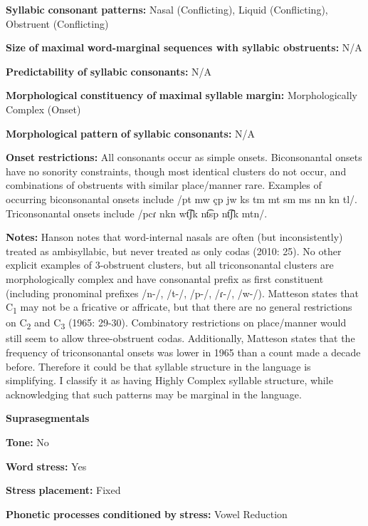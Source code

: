 \textbf{Syllabic} \textbf{consonant} \textbf{patterns:} Nasal (Conflicting), Liquid (Conflicting), Obstruent (Conflicting)

\textbf{Size} \textbf{of} \textbf{maximal} \textbf{word{}-marginal sequences with syllabic obstruents:} N/A

\textbf{Predictability} \textbf{of} \textbf{syllabic} \textbf{consonants:} N/A

\textbf{Morphological} \textbf{constituency} \textbf{of} \textbf{maximal} \textbf{syllable} \textbf{margin:} Morphologically Complex (Onset)

\textbf{Morphological} \textbf{pattern} \textbf{of} \textbf{syllabic} \textbf{consonants:} N/A

\textbf{Onset} \textbf{restrictions:} All consonants occur as simple onsets. Biconsonantal onsets have no sonority constraints, though most identical clusters do not occur, and combinations of obstruents with similar place/manner rare. Examples of occurring biconsonantal onsets include /pt mw çp jw ks tm mt sm ms nn kn tl/. Triconsonantal onsets include /pcɾ nkn wt͡ʃk nt͡sp nt͡ʃk mtn/.

\textbf{Notes:} Hanson notes that word-internal nasals are often (but inconsistently) treated as ambisyllabic, but never treated as only codas (2010: 25). No other explicit examples of 3-obstruent clusters, but all triconsonantal clusters are morphologically complex and have consonantal prefix as first constituent (including pronominal prefixes /n-/, /t-/, /p-/, /ɾ{}-/, /w-/). Matteson states that C\textsubscript{1} may not be a fricative or affricate, but that there are no general restrictions on C\textsubscript{2} and C\textsubscript{3} (1965: 29-30). Combinatory restrictions on place/manner would still seem to allow three-obstruent codas. Additionally, Matteson states that the frequency of triconsonantal onsets was lower in 1965 than a count made a decade before. Therefore it could be that syllable structure in the language is simplifying. I classify it as having Highly Complex syllable structure, while acknowledging that such patterns may be marginal in the language.

\textbf{Suprasegmentals}

\textbf{Tone:} No

\textbf{Word} \textbf{stress:} Yes

\textbf{Stress} \textbf{placement:} Fixed

\textbf{Phonetic} \textbf{processes} \textbf{conditioned} \textbf{by} \textbf{stress:} Vowel Reduction

